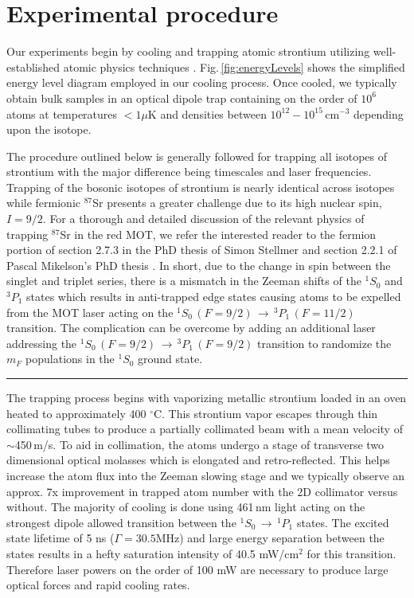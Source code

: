 \section{Experimental procedure} \label{sec:trapping}
\setcounter{footnote}{0}
Our experiments begin by cooling and trapping atomic strontium utilizing well-established atomic physics techniques \cite{Metcalf1999,Katori1999,Ido2000,Nagel2003,Mukaiyama2003a,Loftus2004,mmy09a,sth09a,Mickelson2010ja,Tey2010a,dym10a,stg10}. 
Fig.\,\ref{fig:energyLevels} shows the simplified energy level diagram employed in our cooling process. 
Once cooled, we typically obtain bulk samples in an optical dipole trap containing on the order of $10^6$ atoms at temperatures $<1\mu$K and densities between $10^{12} - 10^{15}\,$cm$^{-3}$ depending upon the isotope. 

The procedure outlined below is generally followed for trapping all isotopes of strontium with the major difference being timescales and laser frequencies.
Trapping of the bosonic isotopes of strontium is nearly identical across isotopes while fermionic $^{87}$Sr presents a greater challenge due to its high nuclear spin, $I=9/2$.
For a thorough and detailed discussion of the relevant physics of trapping $^{87}$Sr in the red MOT, we refer the interested reader to the fermion portion of section 2.7.3 in the PhD thesis of Simon Stellmer \cite{SimonStellmer2013} and section 2.2.1 of Pascal Mikelson's PhD thesis \cite{Mickelson2010b}.
In short, due to the change in spin between the singlet and triplet series, there is a mismatch in the Zeeman shifts of the $^1S_0$ and $^3P_1$ states which results in anti-trapped edge states causing atoms to be expelled from the MOT laser acting on the $^1S_0\,(F=9/2)\,\rightarrow\,^3P_1\,(F=11/2)$ transition.
The complication can be overcome by adding an additional laser addressing the $^1S_0\,(F=9/2)\,\rightarrow\,^3P_1\,(F=9/2)$ transition to randomize the $m_F$ populations in the $^1S_0$ ground state.

\noindent \rule{75pt}{0.5pt} \newline
The trapping process begins with vaporizing metallic strontium loaded in an oven heated to approximately 400 $^{\circ}$C. 
This strontium vapor escapes through thin collimating tubes to produce a partially collimated beam with a mean velocity of $\sim$450\,m/s.
To aid in collimation, the atoms undergo a stage of transverse two dimensional optical molasses which is elongated and retro-reflected.
This helps increase the atom flux into the Zeeman slowing stage and we typically observe an approx. 7x improvement in trapped atom number with the 2D collimator versus without.
The majority of cooling is done using 461\,nm light acting on the strongest dipole allowed transition between the $^1S_0\,\rightarrow\,^1P_1$ states.
The excited state lifetime of 5 ns ($\Gamma=30.5$MHz) and large energy separation between the states results in a hefty saturation intensity of 40.5 mW/cm$^2$ for this transition.
Therefore laser powers on the order of 100 mW are necessary to produce large optical forces and rapid cooling rates.

